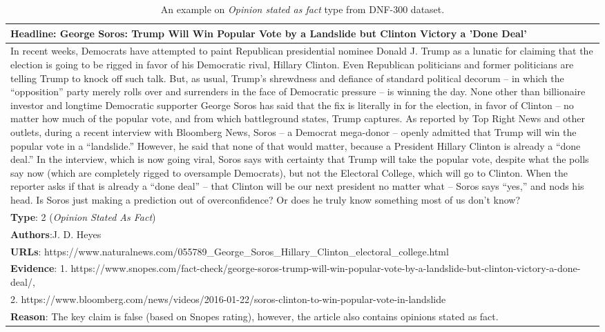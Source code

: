 \documentclass[11pt,a4paper]{article}
\begin{document}
\begin{table*}[t]
\centering
\begin{tabular}{p{15cm}}
\hline
\textbf{Headline}: George Soros: Trump Will Win Popular Vote by a Landslide but Clinton Victory a 'Done Deal'\\
\hline 
In recent weeks, Democrats have attempted to paint Republican presidential nominee Donald J. Trump as a lunatic for claiming that the election is going to be rigged in favor of his Democratic rival, Hillary Clinton. Even Republican politicians and former politicians are telling Trump to knock off such talk. But, as usual, Trump's shrewdness and defiance of standard political decorum – in which the ``opposition'' party merely rolls over and surrenders in the face of Democratic pressure – is winning the day. None other than billionaire investor and longtime Democratic supporter George Soros has said that the fix is literally in for the election, in favor of Clinton – no matter how much of the popular vote, and from which battleground states, Trump captures. As reported by Top Right News and other outlets, during a recent interview with Bloomberg News, Soros – a Democrat mega-donor – openly admitted that Trump will win the popular vote in a ``landslide.'' However, he said that none of that would matter, because a President Hillary Clinton is already a ``done deal.'' In the interview, which is now going viral, Soros says with certainty that Trump will take the popular vote, despite what the polls say now (which are completely rigged to oversample Democrats), but not the Electoral College, which will go to Clinton. When the reporter asks if that is already a ``done deal'' – that Clinton will be our next president no matter what – Soros says ``yes,'' and nods his head. Is Soros just making a prediction out of overconfidence? Or does he truly know something most of us don't know?\\
\hline
\textbf{Type}: 2 (\textit{Opinion Stated As Fact})\\
\textbf{Authors}:J. D. Heyes\\
\textbf{URLs}: https://www.naturalnews.com/055789\_George\_Soros\_Hillary\_Clinton\_electoral\_college.html\\
\hline
\textbf{Evidence}: 1. https://www.snopes.com/fact-check/george-soros-trump-will-win-popular-vote-by-a-landslide-but-clinton-victory-a-done-deal/,\\ 2. https://www.bloomberg.com/news/videos/2016-01-22/soros-clinton-to-win-popular-vote-in-landslide\\
\hline
\textbf{Reason}: The key claim is false (based on Snopes rating), however, the article also contains opinions stated as fact.\\
\hline
\end{tabular}
\caption{\label{tab:dnf300_opinion}An example on \textit{Opinion stated as fact} type from DNF-300 dataset. 
}
\end{table*}
\end{document}
